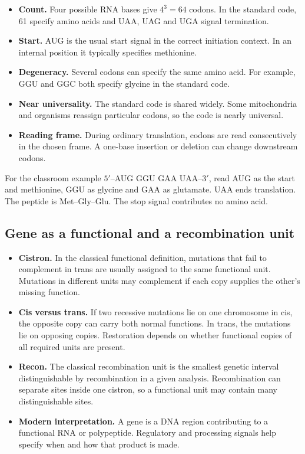 \documentclass[12pt,a4paper]{article}
\begin{document}
\begin{itemize}[leftmargin=*, itemsep=3pt, topsep=4pt]
  \item \textbf{Count.} Four possible RNA bases give $4^3=64$ codons. In the standard code, 61 specify amino acids and UAA, UAG and UGA signal termination.
  \item \textbf{Start.} AUG is the usual start signal in the correct initiation context. In an internal position it typically specifies methionine.
  \item \textbf{Degeneracy.} Several codons can specify the same amino acid. For example, GGU and GGC both specify glycine in the standard code.
  \item \textbf{Near universality.} The standard code is shared widely. Some mitochondria and organisms reassign particular codons, so the code is nearly universal.
  \item \textbf{Reading frame.} During ordinary translation, codons are read consecutively in the chosen frame. A one-base insertion or deletion can change downstream codons.
\end{itemize}
\begin{tcolorbox}[examplebox, title={Read a short illustrative message}]
For the classroom example $5'$--AUG GGU GAA UAA--$3'$, read AUG as the start and methionine, GGU as glycine and GAA as glutamate. UAA ends translation. The peptide is Met--Gly--Glu. The stop signal contributes no amino acid.
\end{tcolorbox}

\subsection{Gene as a functional and a recombination unit}
\begin{itemize}[leftmargin=*, itemsep=3pt, topsep=4pt]
  \item \textbf{Cistron.} In the classical functional definition, mutations that fail to complement in trans are usually assigned to the same functional unit. Mutations in different units may complement if each copy supplies the other's missing function.
  \item \textbf{Cis versus trans.} If two recessive mutations lie on one chromosome in cis, the opposite copy can carry both normal functions. In trans, the mutations lie on opposing copies. Restoration depends on whether functional copies of all required units are present.
  \item \textbf{Recon.} The classical recombination unit is the smallest genetic interval distinguishable by recombination in a given analysis. Recombination can separate sites inside one cistron, so a functional unit may contain many distinguishable sites.
  \item \textbf{Modern interpretation.} A gene is a DNA region contributing to a functional RNA or polypeptide. Regulatory and processing signals help specify when and how that product is made.
\end{itemize}
\end{document}

